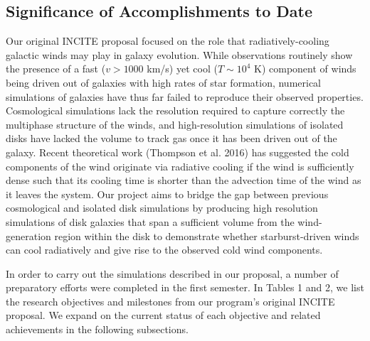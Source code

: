 \documentclass[11pt,letterpaper,english]{article}
\begin{document}
\subsection{Significance of Accomplishments to Date} 


Our original INCITE proposal focused on the role that radiatively-cooling galactic winds may play in galaxy evolution. While observations routinely show the presence of a fast ($v > 1000$ km/s) yet cool ($T\sim10^4$ K) component of winds being driven out of galaxies with high rates of star formation, numerical simulations of galaxies have thus far failed to reproduce their observed properties. 
Cosmological simulations lack the resolution required to capture correctly the multiphase structure of the winds, and high-resolution simulations of isolated disks have lacked the volume to track gas once it has been driven out of the galaxy. Recent theoretical work (Thompson et al. 2016) has suggested the cold components of the wind originate via radiative cooling
if the wind is sufficiently dense such that its cooling time is shorter than the advection time of the
wind as it leaves the system.
Our project aims to bridge the gap between previous cosmological and isolated disk simulations by producing high resolution simulations of disk galaxies that span a sufficient volume from the wind-generation region within the disk to demonstrate whether starburst-driven winds can cool radiatively and give rise to the 
observed cold wind components.

In order to carry out the simulations described in our proposal, a number of preparatory efforts were completed in the first semester. In Tables 1 and 2, we list the research objectives and milestones from our program's original INCITE proposal. We expand on the current status of each objective and related achievements in the following subsections.
\end{document}
